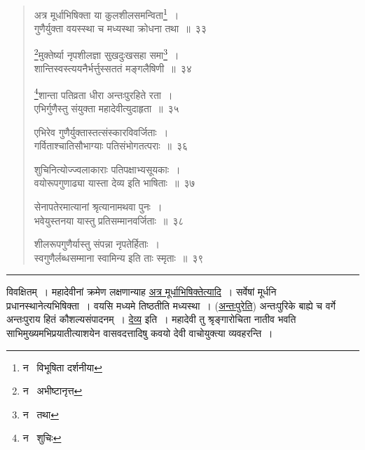 \documentclass[11pt, openany]{book}
\begin{document}
\begin{quote}
{\na अत्र मूर्धाभिषिक्ता या कुलशीलसमन्विता\renewcommand{\thefootnote}{1}\footnote{न \textendash\  विभूषिता दर्शनीया}~।\\
गुणैर्युक्ता वयस्स्था च मध्यस्था क्रोधना तथा~॥~३३

\renewcommand{\thefootnote}{2}\footnote{न \textendash\  अभीष्टानृत्त}मुक्तेर्ष्या नृपशीलज्ञा सुखदुःखसहा समा\renewcommand{\thefootnote}{3}\footnote{न \textendash\  तथा}~।\\
शान्तिस्वस्त्ययनैर्भर्त्तुस्सततं मङ्गलैषिणी~॥~३४

\renewcommand{\thefootnote}{4}\footnote{न \textendash\  शुचिः}शान्ता पतिव्रता धीरा अन्तःपुरहिते रता~।\\
एभिर्गुणैस्तु संयुक्ता महादेवीत्युदाहृता~॥~३५

एभिरेव गुणैर्युक्तास्तत्संस्कारविवर्जिताः~।\\
गर्विताश्चातिसौभाग्याः पतिसंभोगतत्पराः~॥~३६

शुचिनित्योज्ज्वलाकाराः पतिपक्षाभ्यसूयकाः~।\\
वयोरूपगुणाढ्या यास्ता देव्य इति भाषिताः~॥~३७

सेनापतेरमात्यानां श्रृत्यानामथवा पुनः~।\\
भवेयुस्तनया यास्तु प्रतिसम्मानवर्जिताः~॥~३८

शीलरूपगुणैर्यास्तु संपन्ना नृपतेर्हिताः~।\\
स्वगुणैर्लब्धसम्माना स्वामिन्य इति ताः स्मृताः~॥~३९}
\end{quote}

\hrule

\vspace{2mm}
\noindent
विवक्षितम्~। महादेवीनां क्रमेण लक्षणान्याह \underline{अत्र मूर्धाभिषिक्तेत्यादि}~। सर्वेषां मूर्धनि प्रधानस्थानेत्यभिषिक्ता~। वयसि मध्यमे तिष्ठतीति मध्यस्था~। (\underline{अन्तःपुरेति}) अन्तःपुरिके बाह्ये च वर्गे अन्तःपुराय हितं कौशल्यसंपादनम्~। \underline{देव्य} इति~। महादेवी तु श्रृङ्गारोचिता नातीव भवति साभिमुख्यमभिप्रयातीत्याशयेन वासवदत्तादिषु कवयो देवी वाचोयुक्त्या व्यवहरन्ति~।

\newpage
\end{document}
